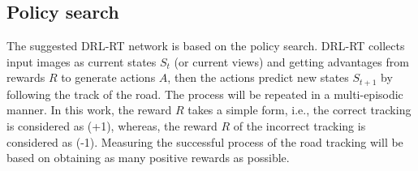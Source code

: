 \documentclass{svproc}
\begin{document}
	\subsection{Policy search} 
	The suggested DRL-RT network is based on the policy search. %
	DRL-RT collects input images as current states $S_t$ (or current views) and getting advantages from rewards $R$ to generate actions $A$, then the actions predict new states $S_{t+1}$ by following the track of the road. The process will be repeated in a multi-episodic manner. %
	In this work, the reward $R$ takes a simple form, i.e., the correct tracking is considered as (+1), whereas, the reward $R$ of the incorrect tracking is considered as (-1). Measuring the successful process of the road tracking will be based on obtaining as many positive rewards as possible. 
\end{document}
